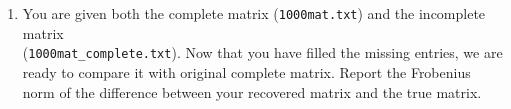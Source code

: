 \begin{enumerate}
\begin{enumerate}
\item You are given both the complete matrix (\texttt{1000mat.txt}) and the incomplete matrix\\ (\texttt{1000mat\_complete.txt}). Now that you have filled the missing entries, we are ready to compare it with original complete matrix. Report the Frobenius norm of the difference between your recovered matrix and the true matrix. 

\end{enumerate}


\end{enumerate}






